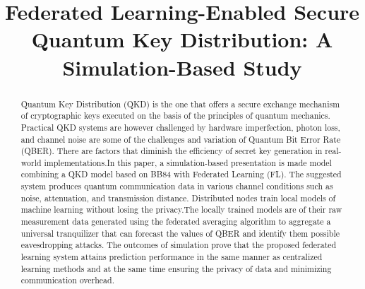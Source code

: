 \documentclass[conference]{IEEEtran}
\begin{document}
\title{Federated Learning-Enabled Secure Quantum Key Distribution: A Simulation-Based Study}

\author{


\and


}

\maketitle

\begin{abstract}

Quantum Key Distribution (QKD) is the one that offers a secure exchange mechanism of cryptographic keys executed on the basis of the principles of quantum mechanics. Practical QKD systems are however challenged by hardware imperfection, photon loss, and channel noise are some of the challenges and variation of Quantum Bit Error Rate (QBER). There are factors that diminish the efficiency of secret key generation in real-world implementations.In this paper, a simulation-based presentation is made model combining a QKD model based on BB84 with Federated Learning (FL). The suggested system produces quantum communication data in various channel conditions such as noise, attenuation, and transmission distance. Distributed nodes train local models of machine learning without losing the privacy.The locally trained models are of their raw measurement data generated using the federated averaging algorithm to aggregate a universal tranquilizer that can forecast the values of QBER and identify them possible eavesdropping attacks. The outcomes of simulation prove that the proposed federated learning system attains prediction performance in the same manner as centralized learning methods and at the same time ensuring the privacy of data and minimizing communication overhead.

\end{abstract}
\end{document}
